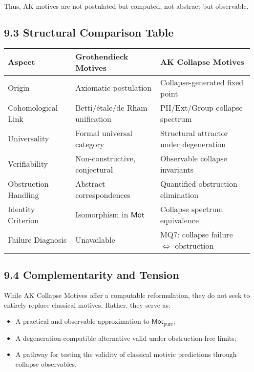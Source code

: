 \documentclass[11pt]{article}
\begin{document}
Thus, AK motives are not postulated but computed, not abstract but observable.

\subsection{9.3 Structural Comparison Table}

\vspace{0.5em}
\begin{center}
\begin{tabular}{|l|l|l|}
\hline
\textbf{Aspect} & \textbf{Grothendieck Motives} & \textbf{AK Collapse Motives} \\
\hline
Origin & Axiomatic postulation & Collapse-generated fixed point \\
\hline
Cohomological Link & Betti/étale/de Rham unification & PH/Ext/Group collapse spectrum \\
\hline
Universality & Formal universal category & Structural attractor under degeneration \\
\hline
Verifiability & Non-constructive, conjectural & Observable collapse invariants \\
\hline
Obstruction Handling & Abstract correspondences & Quantified obstruction elimination \\
\hline
Identity Criterion & Isomorphism in $\mathsf{Mot}$ & Collapse spectrum equivalence \\
\hline
Failure Diagnosis & Unavailable & MQ7: collapse failure $\iff$ obstruction \\
\hline
\end{tabular}
\end{center}
\vspace{0.5em}

\subsection{9.4 Complementarity and Tension}

While AK Collapse Motives offer a computable reformulation, they do not seek to entirely replace classical motives. Rather, they serve as:

\begin{itemize}
    \item A practical and observable approximation to $\mathsf{Mot}_{\mathrm{pure}}$;
    \item A degeneration-compatible alternative valid under obstruction-free limits;
    \item A pathway for testing the validity of classical motivic predictions through collapse observables.
\end{itemize}
\end{document}

